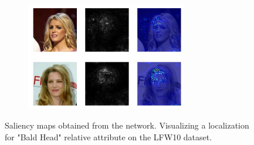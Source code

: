 \documentclass[10pt,twocolumn,letterpaper]{article}
\begin{document}
\begin{figure}
\begin{subfigure}
    \end{subfigure}
    \begin{subfigure}
        \centering
        \includegraphics[width=7cm]{saliency-new/LFW/bald-6}
    \end{subfigure}
    
    \caption{Saliency maps obtained from the network. Visualizing a localization for "Bald Head" relative attribute on the LFW10 dataset.}
    \label{sal.lfw.bald}
\end{figure}
\end{document}
